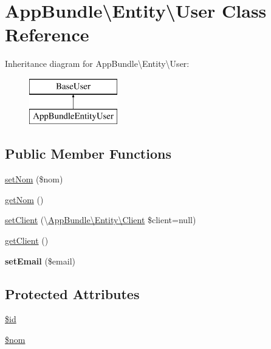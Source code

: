 \hypertarget{class_app_bundle_1_1_entity_1_1_user}{}\section{App\+Bundle\textbackslash{}Entity\textbackslash{}User Class Reference}
\label{class_app_bundle_1_1_entity_1_1_user}
Inheritance diagram for App\+Bundle\textbackslash{}Entity\textbackslash{}User\+:\begin{figure}[H]
\begin{center}
\leavevmode
\includegraphics[height=2.000000cm]{class_app_bundle_1_1_entity_1_1_user}
\end{center}
\end{figure}
\subsection*{Public Member Functions}
\begin{DoxyCompactItemize}
\item 
\hyperlink{class_app_bundle_1_1_entity_1_1_user_a974167e2fffad9fdcb9c48bc701a160e}{set\+Nom} (\$nom)
\item 
\hyperlink{class_app_bundle_1_1_entity_1_1_user_a75bca6b6fcf4f985f309c8d98b95463b}{get\+Nom} ()
\item 
\hyperlink{class_app_bundle_1_1_entity_1_1_user_a47a2ee3237dc3dbb2ffd51c0217770ef}{set\+Client} (\textbackslash{}\hyperlink{class_app_bundle_1_1_entity_1_1_client}{App\+Bundle\textbackslash{}\+Entity\textbackslash{}\+Client} \$client=null)
\item 
\hyperlink{class_app_bundle_1_1_entity_1_1_user_a2cf8ec462de7bd0bf7b04c58ab27cbfc}{get\+Client} ()
\item 
\mbox{\label{class_app_bundle_1_1_entity_1_1_user_a717949a66aa01fdba29d464294d60723}} 
{\bfseries set\+Email} (\$email)
\end{DoxyCompactItemize}
\subsection*{Protected Attributes}
\begin{DoxyCompactItemize}
\item 
\hyperlink{class_app_bundle_1_1_entity_1_1_user_ae12a261b5ca7565baa6c166854cc9860}{\$id}
\item 
\hyperlink{class_app_bundle_1_1_entity_1_1_user_af852a8421771764053becd1846f8dad0}{\$nom}
\end{DoxyCompactItemize}


